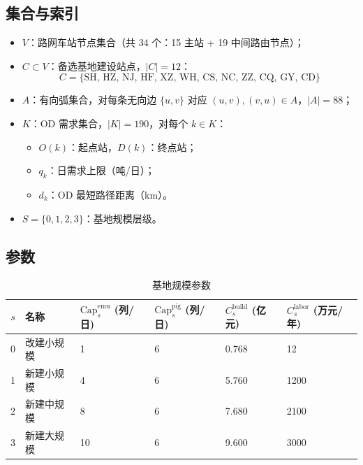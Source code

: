 \documentclass[12pt,a4paper,fontset=none]{ctexart}
\begin{document}
\subsection{集合与索引}

\begin{itemize}[leftmargin=*]
    \item $V$：路网车站节点集合（共 34 个：15 主站 + 19 中间路由节点）；
    \item $C \subset V$：备选基地建设站点，$|C|=12$：
          $$C = \{\text{SH, HZ, NJ, HF, XZ, WH, CS, NC, ZZ, CQ, GY, CD}\}$$
    \item $A$：有向弧集合，对每条无向边 $\{u,v\}$ 对应 $(u,v),(v,u)\in A$，$|A|=88$；
    \item $K$：OD 需求集合，$|K|=190$，对每个 $k\in K$：
          \begin{itemize}
              \item $O(k)$：起点站，$D(k)$：终点站；
              \item $q_k$：日需求上限（吨/日）；
              \item $d_k$：OD 最短路径距离（km）。
          \end{itemize}
    \item $S=\{0,1,2,3\}$：基地规模层级。
\end{itemize}

\subsection{参数}

\begin{table}[H]
\centering\small
\caption{基地规模参数}
\label{tab:scale}
\begin{tabular}{cC{2.2cm}C{2.2cm}C{2.2cm}C{2.2cm}C{2.5cm}}
\toprule
$s$ & 名称 & $\text{Cap}_s^{\text{emu}}$ (列/日) & $\text{Cap}_s^{\text{pig}}$ (列/日) & $C_s^{\text{build}}$ (亿元) & $C_s^{\text{labor}}$ (万元/年) \\
 & 改建小规模 & 1  & 6 & 0.768  & 12    \\
1 & 新建小规模 & 4  & 6 & 5.760  & 1200  \\
2 & 新建中规模 & 8  & 6 & 7.680  & 2100  \\
3 & 新建大规模 & 10 & 6 & 9.600  & 3000  \\
\bottomrule
\end{tabular}
\end{table}
\end{document}
